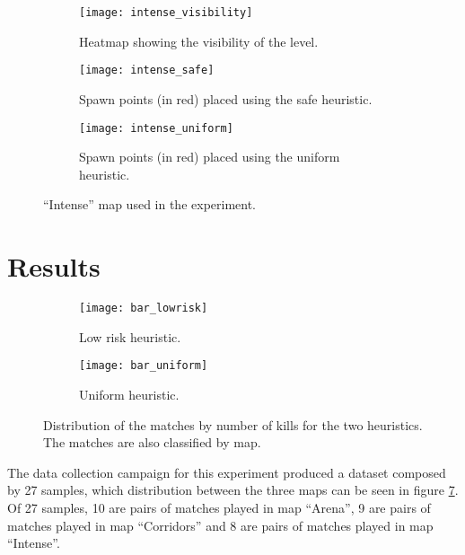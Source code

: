 \begin{figure}[tp]
	\centering  	
  	\begin{subfigure}[t]{0.3\linewidth}
    		\texttt{[image: intense\_visibility]}
     		\caption{Heatmap showing the visibility of the level.}
		\label{img:intense_visibility}
  	\end{subfigure}  	
  	\hfil
  	\begin{subfigure}[t]{0.3\linewidth}
    		\texttt{[image: intense\_safe]}
     		\caption{Spawn points (in red) placed using the safe heuristic.}
     		\label{img:intense_safe}
  	\end{subfigure}
  	\hfil
  	\begin{subfigure}[t]{0.3\linewidth}
    		\texttt{[image: intense\_uniform]}
     		\caption{Spawn points (in red) placed using the uniform heuristic.}
		\label{img:intense_uniform}
  	\end{subfigure}
	\caption{``Intense'' map used in the experiment.}
	\label{img:intense}	
\end{figure}


\section{Results}

\begin{figure}
 	\centering
  	\begin{subfigure}[t]{0.8\linewidth}
    		\texttt{[image: bar\_lowrisk]}
     		\caption{Low risk heuristic.}
		\label{img:bar_lowrisk}
  	\end{subfigure}  	
  	\begin{subfigure}[t]{0.8\linewidth}
    		\texttt{[image: bar\_uniform]}
     		\caption{Uniform heuristic.}
     		\label{img:bar_uniform}
  	\end{subfigure}
	\caption[Distribution of the matches by number of kills for the two heuristics.]{Distribution of the matches by number of kills for the two heuristics. The matches are also classified by map.}
	\label{img:match_distribution}	
\end{figure}

The data collection campaign for this experiment produced a dataset composed by 27 samples, which distribution between the three maps can be seen in figure \ref{img:match_distribution}. Of 27 samples, 10 are pairs of matches played in map ``Arena'', 9 are pairs of matches played in map ``Corridors'' and 8 are pairs of matches played in map ``Intense''. 

